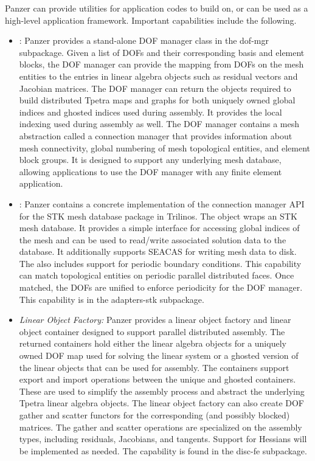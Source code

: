 Panzer can provide utilities for application codes to build on, or can be used as a high-level application framework. Important capabilities include the following.
\begin{itemize}
\item {}: Panzer provides a stand-alone DOF manager class in the dof-mgr subpackage. Given a list of DOFs and their corresponding basis and element blocks, the DOF manager can provide the mapping from DOFs on the mesh entities to the entries in linear algebra objects such as residual vectors and Jacobian matrices. The DOF manager can return the objects required to build distributed Tpetra
maps and graphs for both uniquely owned global indices and ghosted indices used during assembly.
It provides the local indexing used during assembly as well. The DOF manager contains a mesh abstraction called a connection manager that provides information about mesh connectivity, global numbering of mesh topological entities, and element block groups. It is designed to support any underlying mesh database, allowing applications to use the DOF manager with any finite element application.
\item {}: Panzer contains a concrete implementation of the connection manager API for the STK mesh database package in Trilinos. The  object wraps an STK mesh database. It provides a simple interface for accessing global indices of the mesh and can be used to read/write associated solution data to the database. It additionally supports SEACAS for writing mesh data to disk. The  also includes support for periodic boundary conditions.  This capability can match topological entities on periodic parallel distributed faces. Once matched, the DOFs are unified to enforce periodicity for the DOF manager. This capability is in the adapters-stk subpackage.
\item \emph{Linear Object Factory:} Panzer provides a linear object factory and linear object container designed to support parallel distributed assembly.
The returned containers hold either the linear algebra objects for a uniquely owned DOF map used for solving the linear system or a ghosted version of the linear objects that can be used for assembly. The containers support export and import operations between the unique and ghosted containers. These are used to simplify the assembly process and abstract the underlying Tpetra linear algebra objects.
The linear object factory can also create DOF gather and scatter functors for the corresponding (and possibly blocked) matrices. The gather and scatter operations are specialized on the assembly types, including residuals, Jacobians, and tangents.
Support for Hessians will be implemented as needed.
The capability is found in the disc-fe subpackage.


\end{itemize}
